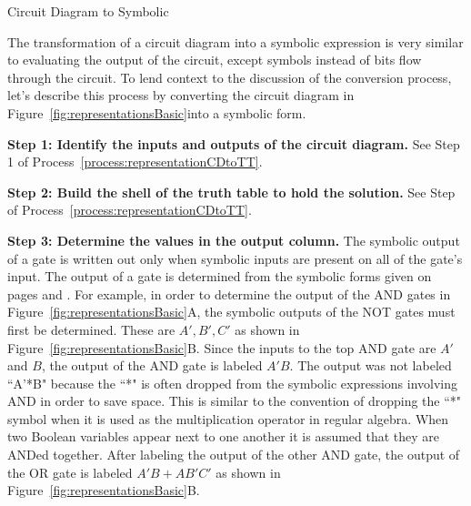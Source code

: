 \begin{process}{Circuit Diagram to Symbolic}
\label{process:representationdCdToSym}

The transformation of a circuit diagram into a symbolic expression 
is very similar to evaluating the output of the circuit, except symbols
instead of bits flow through the circuit.  To lend context to the discussion 
of the conversion process, let's describe this process by converting the 
circuit diagram in Figure~\ref{fig:representationsBasic}into a symbolic form.

\textbf{Step 1:  Identify the inputs and outputs of the circuit diagram.}
See Step 1 of Process~\ref{process:representationCDtoTT}.

\textbf{Step 2: Build the shell of the truth table to hold the solution. }
See Step of Process~\ref{process:representationCDtoTT}.

\textbf{Step 3: Determine the values in the output column. }
The symbolic output of a gate is written out only when symbolic inputs 
are present on all of the 
gate's input.  The output of a gate is determined from the symbolic forms
given on pages \pageref{page:elf1} and \pageref{page:elf2}.  
For example, in 
order to determine the output of the AND gates in Figure~\ref{fig:representationsBasic}A, the
symbolic outputs of the NOT gates must first be determined.  These are
$A', B', C'$ as shown in Figure~\ref{fig:representationsBasic}B.
Since the inputs to the top AND gate are $A'$ and $B$, the output of the AND
gate is labeled $A'B$.  The output was not labeled ``A'*B" because the
``*" is often dropped from the symbolic expressions involving AND 
in order to save space.  This is similar to the convention 
of dropping the ``*" symbol when it is used
as the multiplication operator in regular algebra.  When two Boolean 
variables appear next to one another it is assumed that they are ANDed together.
After labeling the output of the other AND gate, the output of the OR gate 
is labeled $A'B + AB'C'$ as shown in Figure~\ref{fig:representationsBasic}B.

{\setlength{\fboxsep}{0pt}
\centering  
{}
\par}\vspace{0.2cm}



\end{process}

